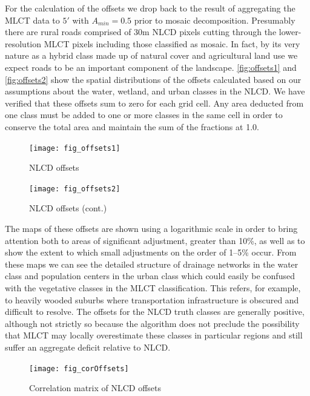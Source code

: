 For the calculation of the offsets we drop back to the result of
aggregating the MLCT data to $5'$ with $A_{min}=0.5$ prior to mosaic
decomposition.  Presumably there are rural roads comprised of 30m NLCD
pixels cutting through the lower-resolution MLCT pixels including
those classified as mosaic.  In fact, by its very nature as a hybrid
class made up of natural cover and agricultural land use we expect
roads to be an important component of the landscape.
\autoref{fig:offsets1} and \autoref{fig:offsets2} show the spatial
distributions of the offsets calculated based on our assumptions about
the water, wetland, and urban classes in the NLCD.  We have verified
that these offsets sum to zero for each grid cell.  Any area deducted
from one class must be added to one or more classes in the same cell
in order to conserve the total area and maintain the sum of the
fractions at 1.0.


\begin{figure}[h]
  \centering


\texttt{[image: fig\_offsets1]}
  \caption{NLCD offsets}
  \label{fig:offsets1} 
\end{figure} 


\begin{figure}[h]
  \centering


\texttt{[image: fig\_offsets2]}
  \caption{NLCD offsets (cont.)}
  \label{fig:offsets2} 
\end{figure} 


The maps of these offsets are shown using a logarithmic scale in
order to bring attention both to areas of significant adjustment,
greater than 10\%, as well as to show the extent to which small
adjustments on the order of 1--5\% occur.  From these maps we can see
the detailed structure of drainage networks in the water class and
population centers in the urban class which could easily be confused
with the vegetative classes in the MLCT classification.  This refers,
for example, to heavily wooded suburbs where transportation
infrastructure is obscured and difficult to resolve.  The offsets for
the NLCD truth classes are generally positive, although not strictly
so because the algorithm does not preclude the possibility that MLCT
may locally overestimate these classes in particular regions and still
suffer an aggregate deficit relative to NLCD.


\begin{figure}[ht]
  \centering
    \texttt{[image: fig\_corOffsets]}
  \caption{Correlation matrix of NLCD offsets}
  \label{fig:corOffsets} 
\end{figure} 

